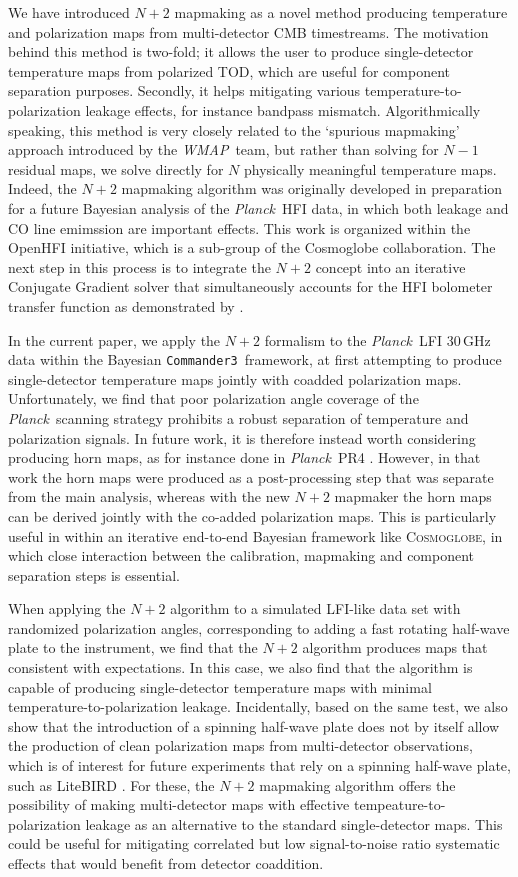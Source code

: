\documentclass{aa}
\def\commanderthree{\texttt{Commander3}}
\newcommand{\Cosmoglobe}{\textsc{Cosmoglobe}}
\def\Cosmoglobe{\textsc{Cosmoglobe}}
\def\Planck{\textit{Planck}}
\def\WMAP{\textit{WMAP}}
\begin{document}
We have introduced $N+2$ mapmaking as a novel method producing temperature and polarization maps from multi-detector CMB timestreams. The motivation behind this method is two-fold; it allows the user to produce single-detector temperature maps from polarized TOD, which are useful for component separation purposes. Secondly, it helps mitigating various temperature-to-polarization leakage effects, for instance bandpass mismatch. Algorithmically speaking, this method is very closely related to the `spurious mapmaking' approach introduced by the \WMAP\ team, but rather than solving for $N-1$ residual maps, we solve directly for $N$ physically meaningful temperature maps. Indeed, the $N+2$ mapmaking algorithm was originally developed in preparation for a future Bayesian analysis of the \Planck\ HFI data, in which both leakage and CO line emimssion are important effects. This work is organized within the OpenHFI initiative, which is a sub-group of the Cosmoglobe collaboration. The next step in this process is to integrate the $N+2$ concept into an iterative Conjugate Gradient solver that simultaneously accounts for the HFI bolometer transfer function as demonstrated by \cite{artem}. 

In the current paper, we apply the $N+2$ formalism to the \Planck\ LFI 30\,GHz data within the Bayesian \commanderthree\ framework, at first attempting to produce single-detector temperature maps jointly with coadded polarization maps. Unfortunately, we find that poor polarization angle coverage of the \Planck\ scanning strategy prohibits a robust separation of temperature and polarization signals. In future work, it is therefore instead worth considering producing horn maps, as for instance done in \Planck\ PR4 \citep{npipe}. However, in that work the horn maps were produced as a post-processing step that was separate from the main analysis, whereas with the new $N+2$ mapmaker the horn maps can be derived jointly with the co-added polarization maps. This is particularly useful in within an iterative end-to-end Bayesian framework like \Cosmoglobe, in which close interaction between the calibration, mapmaking and component separation steps is essential.    

When applying the $N+2$ algorithm to a simulated LFI-like data set with randomized polarization angles, corresponding to adding a fast rotating half-wave plate to the instrument, we find that the $N+2$ algorithm produces maps that consistent with expectations. In this case, we also find that the algorithm is capable of producing single-detector temperature maps with minimal temperature-to-polarization leakage. Incidentally, based on the same test, we also show that the introduction of a spinning half-wave plate does not by itself allow the production of clean polarization maps from multi-detector observations, which is of interest for future experiments that rely on a spinning half-wave plate, such as LiteBIRD \citep{litebird2022}. For these, the $N+2$ mapmaking algorithm offers the possibility of making multi-detector maps with effective tempeature-to-polarization leakage as an alternative to the standard single-detector maps. This could be useful for mitigating correlated but low signal-to-noise ratio systematic effects that would benefit from detector coaddition. 
\end{document}

